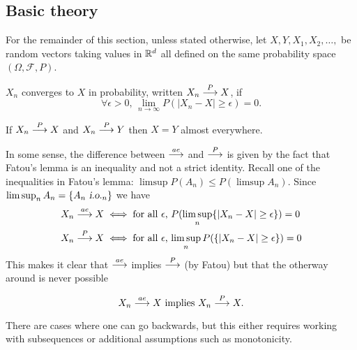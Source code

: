 \subsection{Basic theory}


\begin{sectionassumption} For the remainder of this section, unless stated otherwise, let $X, Y, X_1, X_2, \ldots, $  be random vectors taking values in $\Bbb R^d$ all defined on the same probability space   $(\Omega, \mathcal F, P)$.
\end{sectionassumption}




\begin{definition}
 $X_n$ converges to $X$ in probability, written $X_n\overset{\small P} \longrightarrow X$, if
\[\forall \epsilon>0,\, \lim_{n\rightarrow\infty} P(|X_n-X|\geq \epsilon)=0. \]
\end{definition}


\begin{theorem}
If $X_n\overset{\small P} \longrightarrow X$ and  $X_n\overset{\small P} \longrightarrow Y$ then  $X=Y$  almost everywhere.
\end{theorem}



In some sense, the difference between $\overset{\small ae} \longrightarrow$ and $\overset{\small P} \longrightarrow$ is given by the fact that Fatou's lemma is an inequality and not a strict identity. Recall one of the inequalities in Fatou's lemma: $\limsup P(A_n) \leq P(\limsup A_n)$. Since $\limsup_n A_n = \{A_n {\,\,\text{\sl i.o.} }_n \}$ we have
\begin{align*}
X_n \overset{\small ae} \longrightarrow X &\iff \text{for all $\epsilon$, $P(\limsup_n \{|X_n-X|\geq \epsilon\}) = 0$}\\
X_n \overset{\small P} \longrightarrow X &\iff \text{for all $\epsilon$, $\limsup_n  P(\{|X_n-X|\geq \epsilon\}) = 0$}
\end{align*}
This makes it clear that $\overset{\small ae} \longrightarrow$  implies $\overset{\small P} \longrightarrow$ (by Fatou) but that the otherway around is never possible



\begin{theorem}[{\bf $ae$ implies $P$}]
\begin{equation}
X_n\overset{\small ae} \longrightarrow X 
\text{ implies } X_n \overset{\small P} \longrightarrow X.
\end{equation}
\end{theorem}


There are cases where one can go backwards, but this either requires working with subsequences or additional assumptions such as monotonicity.



